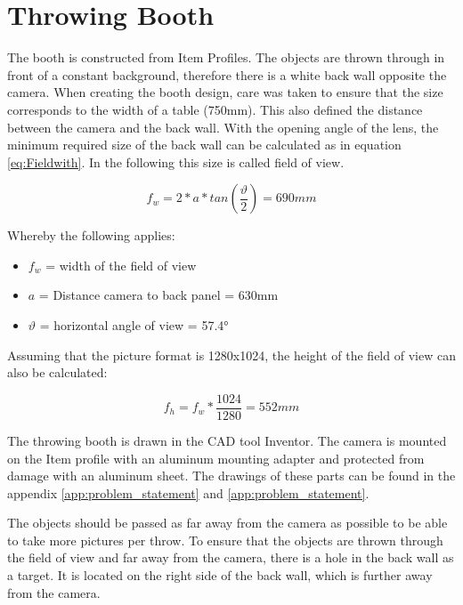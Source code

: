 \section{Throwing Booth}
\label{sec:booth}
The booth is constructed from Item Profiles.
The objects are thrown through in front of a constant background, therefore there is a white back wall opposite the camera.
When creating the booth design, care was taken to ensure that the size corresponds to the width of a table (750mm).
This also defined the distance between the camera and the back wall.
With the opening angle of the lens, the minimum required size of the back wall can be calculated as in equation \ref{eq:Fieldwith}. 
In the following this size is called field of view.

\begin{equation}
	f_w = 2*a*tan\left( \frac{\vartheta}{2}\right) = 690mm
	\label{eq:Fieldwith}
\end{equation}

Whereby the following applies:
\begin{itemize}
	\item $f_w$ = width of the field of view
	\item $a$ = Distance camera to back panel = 630mm
	\item $\vartheta$ = horizontal angle of view = 57.4° \cite{BaumerLense}
\end{itemize}

Assuming that the picture format is 1280x1024, the height of the field of view can also be calculated:

\begin{equation}
	f_h = f_w*\frac{1024}{1280} = 552mm
	\label{eq:Fieldhight}
\end{equation}

The throwing booth is drawn in the CAD tool Inventor.
The camera is mounted on the Item profile with an aluminum mounting adapter and protected from damage with an aluminum sheet.
The drawings of these parts can be found in the appendix \ref{app:problem_statement} and \ref{app:problem_statement}. 

The objects should be passed as far away from the camera as possible to be able to take more pictures per throw.
To ensure that the objects are thrown through the field of view and far away from the camera, there is a hole in the back wall as a target.
It is located on the right side of the back wall, which is further away from the camera.


